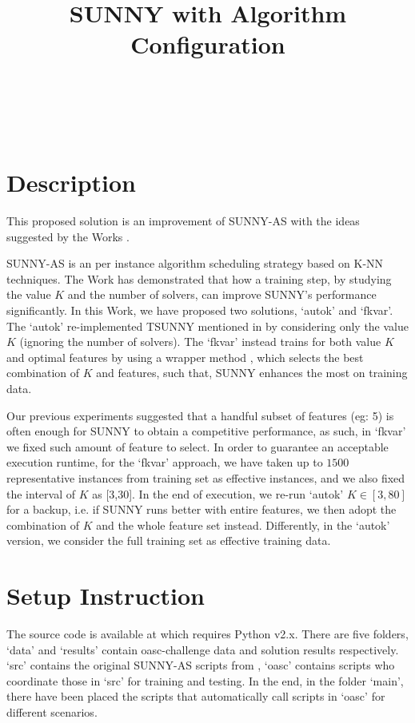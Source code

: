 \documentclass[tablecaption=bottom,wcp]{jmlr} %
\title[SUNNY-OASC]{SUNNY with Algorithm Configuration}
\author{\Name{Tong Liu} \Email{t.liu@unibo.it}\\
   \Name{Roberto Amadini} \Email{roberto.amadini@unimelb.edu.au}\\
   \Name{Jacopo Mauro} \Email{mauro.jacopo@gmail.com}\\
    }
\begin{document}
\maketitle



\section{Description}
This proposed solution is an improvement of SUNNY-AS \cite{DBLP:conf/cilc/AmadiniBGLM15,sunnyas} with the ideas suggested by the Works \cite{DBLP:conf/lion/LindauerBH16,Kohavi97wrappersfor}.

SUNNY-AS is an per instance algorithm scheduling strategy based on K-NN techniques. The Work \cite{DBLP:conf/lion/LindauerBH16} has demonstrated that how a training step, by studying the value $K$ and the number of solvers, can improve SUNNY's performance significantly. In this Work, we have proposed two solutions, `autok' and `fkvar'. The `autok' re-implemented TSUNNY mentioned in \cite{DBLP:conf/lion/LindauerBH16} by considering only the value $K$ (ignoring the number of solvers). The `fkvar' instead trains for both value $K$ and optimal features by using a wrapper method \cite{Kohavi97wrappersfor}, which selects the best combination of $K$ and features, such that, SUNNY enhances the most on training data. 

Our previous experiments \cite{DBLP:conf/cilc/AmadiniBGLM15} suggested that a handful subset of features (eg: 5) is often enough for SUNNY to obtain a competitive performance, as such, in `fkvar' we fixed such amount of feature to select. In order to guarantee an acceptable execution runtime, for the `fkvar' approach, we have taken up to $1500$ representative instances from training set as effective instances, and we also fixed the interval of $K$ as [3,30]. In the end of execution, we re-run `autok' $K \in [3,80]$ for a backup, i.e. if SUNNY runs better with entire features, we then adopt the combination of $K$ and the whole feature set instead. Differently, in the `autok' version, we consider the full training set as effective training data.

\section{Setup Instruction}

The source code is available at \cite{sunnyoasc} which requires Python v2.x. There are five folders, `data' and `results' contain oasc-challenge data and solution results respectively. `src' contains the original SUNNY-AS scripts from \cite{sunnyas}, `oasc' contains scripts who coordinate those in `src' for training and testing. In the end, in the folder `main', there have been placed the scripts that automatically call scripts in `oasc' for different scenarios. 
\end{document}
